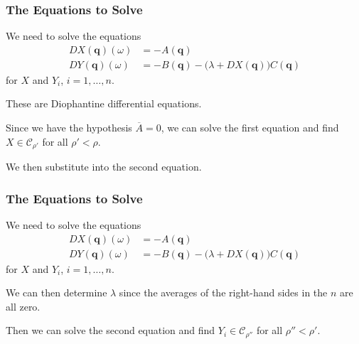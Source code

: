 \documentclass{beamer}
\newcommand{\bp}[1]{\bm{#1}}
\begin{document}
\begin{frame}
  \frametitle{The Equations to Solve}
  We need to solve the equations
  \begin{align*}
    DX(\bp{q})(\omega) &= -A(\bp{q})\\
    DY(\bp{q})(\omega) &= -B(\bp{q}) - \big( \lambda + DX(\bp{q}) \big)
                C(\bp{q})
  \end{align*}
  for $X$ and $Y_i$, $i = 1, \ldots, n$.

  These are Diophantine differential equations.

  Since we have the hypothesis $\overline{A} = 0$, we can solve the first
  equation and find $X \in \mathcal{C}_{\rho'}$ for all $\rho' < \rho$.

  We then substitute into the second equation.
\end{frame}

\begin{frame}
  \frametitle{The Equations to Solve}
  We need to solve the equations
  \begin{align*}
    DX(\bp{q})(\omega) &= -A(\bp{q})\\
    DY(\bp{q})(\omega) &= -B(\bp{q}) - \big( \lambda + DX(\bp{q}) \big)
                C(\bp{q})
  \end{align*}
  for $X$ and $Y_i$, $i = 1, \ldots, n$.

  We can then determine $\lambda$ since the averages of the right-hand sides in
  the $n$ are all zero.

  Then we can solve the second equation and find $Y_i \in \mathcal{C}_{\rho''}$
  for all $\rho'' < \rho'$.
\end{frame}
\end{document}
